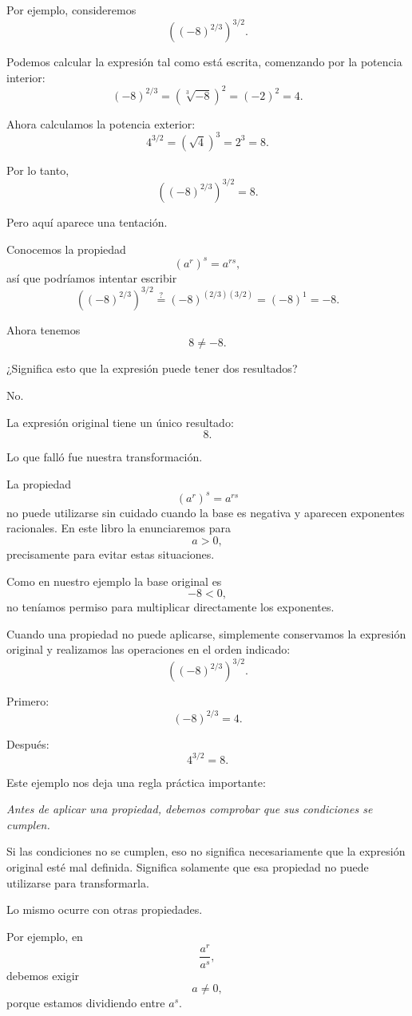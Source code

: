 Por ejemplo, consideremos
\[
\left((-8)^{2/3}\right)^{3/2}.
\]

Podemos calcular la expresión tal como está escrita, comenzando por la potencia interior:
\[
(-8)^{2/3}
=
\left(\sqrt[3]{-8}\right)^2
=
(-2)^2
=
4.
\]

Ahora calculamos la potencia exterior:
\[
4^{3/2}
=
\left(\sqrt{4}\right)^3
=
2^3
=
8.
\]

Por lo tanto,
\[
\boxed{
\left((-8)^{2/3}\right)^{3/2}=8
}.
\]

Pero aquí aparece una tentación.

Conocemos la propiedad
\[
(a^r)^s=a^{rs},
\]
así que podríamos intentar escribir
\[
\left((-8)^{2/3}\right)^{3/2}
\stackrel{?}{=}
(-8)^{(2/3)(3/2)}
=
(-8)^1
=
-8.
\]

Ahora tenemos
\[
8\neq -8.
\]

¿Significa esto que la expresión puede tener dos resultados?

No.

La expresión original tiene un único resultado:
\[
8.
\]

Lo que falló fue nuestra transformación.

La propiedad
\[
(a^r)^s=a^{rs}
\]
no puede utilizarse sin cuidado cuando la base es negativa y aparecen exponentes racionales. En este libro la enunciaremos para
\[
a>0,
\]
precisamente para evitar estas situaciones.

Como en nuestro ejemplo la base original es
\[
-8<0,
\]
no teníamos permiso para multiplicar directamente los exponentes.

Cuando una propiedad no puede aplicarse, simplemente conservamos la expresión original y realizamos las operaciones en el orden indicado:
\[
\left((-8)^{2/3}\right)^{3/2}.
\]

Primero:
\[
(-8)^{2/3}=4.
\]

Después:
\[
4^{3/2}=8.
\]

Este ejemplo nos deja una regla práctica importante:
\begin{center}
  \textit{Antes de aplicar una propiedad, debemos comprobar que sus condiciones se cumplen.}
\end{center}

Si las condiciones no se cumplen, eso no significa necesariamente que la expresión original esté mal definida. Significa solamente que esa propiedad no puede utilizarse para transformarla.

Lo mismo ocurre con otras propiedades.

Por ejemplo, en
\[
\frac{a^r}{a^s},
\]
debemos exigir
\[
a\neq0,
\]
porque estamos dividiendo entre \(a^s\).

